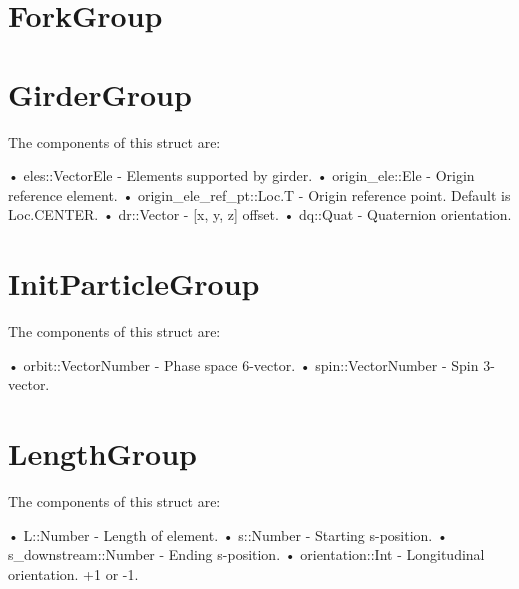 \section{ForkGroup}
\label{s:fork.g}

\section{GirderGroup}
\label{s:girder.g}

The components of this struct are:
\begin{example}
• eles::Vector{Ele}         - Elements supported by girder. 
• origin_ele::Ele           - Origin reference element. 
• origin_ele_ref_pt::Loc.T  - Origin reference point. Default is Loc.CENTER. 
• dr::Vector                - [x, y, z] offset. 
• dq::Quat                   - Quaternion orientation. 
\end{example}


\section{InitParticleGroup}
\label{s:init.particle.g}

The components of this struct are:
\begin{example}
• orbit::Vector{Number}     - Phase space 6-vector. 
• spin::Vector{Number}      - Spin 3-vector. \end{example}

\section{LengthGroup}
\label{s:length.g}

The components of this struct are:
\begin{example}
• L::Number               - Length of element. 
• s::Number               - Starting s-position. 
• s_downstream::Number    - Ending s-position. 
• orientation::Int        - Longitudinal orientation. +1 or -1. 
\end{example}

